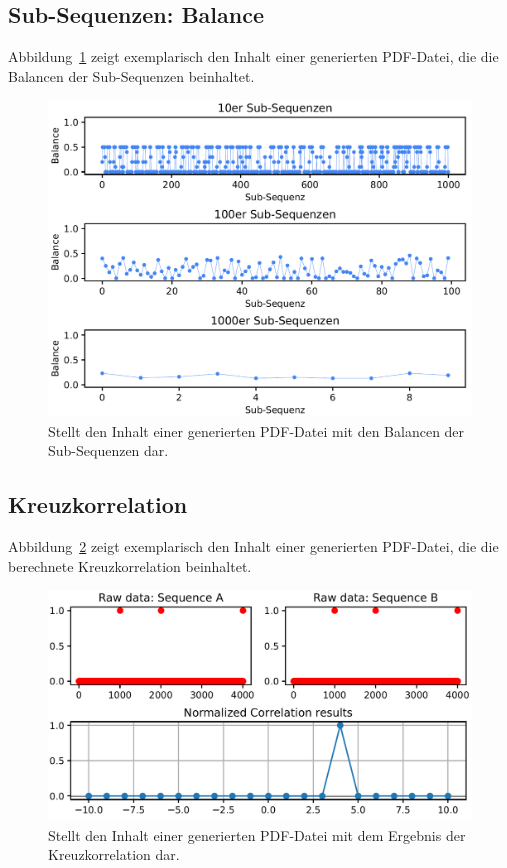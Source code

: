 \newpage
\subsection{Sub-Sequenzen: Balance}
Abbildung~\ref{fig:result:sub:bal} zeigt exemplarisch den Inhalt einer generierten PDF-Datei, die die Balancen der Sub-Sequenzen beinhaltet.
\begin{figure}[H]
	\includegraphics[width=\linewidth]{attachements/python/balance.PNG}
	\caption[Anhang: Balance der Sub-Sequenzen]{Stellt den Inhalt einer generierten PDF-Datei mit den Balancen der Sub-Sequenzen dar\footnotemark.}
	\label{fig:result:sub:bal}
\end{figure}

\newpage
\subsection{Kreuzkorrelation}
Abbildung~\ref{fig:result:crosscorr} zeigt exemplarisch den Inhalt einer generierten PDF-Datei, die die berechnete Kreuzkorrelation beinhaltet.
\begin{figure}[H]
	\includegraphics[width=\linewidth]{attachements/python/cross_correlation.PNG}
	\caption[Anhang: Ergebnis der Kreuzkorrelation]{Stellt den Inhalt einer generierten PDF-Datei mit dem Ergebnis der Kreuzkorrelation dar\footnotemark.}
	\label{fig:result:crosscorr}
\end{figure}

